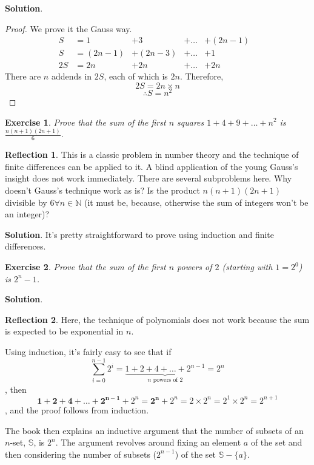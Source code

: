 \documentclass[11pt]{book}
\theoremstyle{definition}
\theoremstyle{plain}
\newtheorem{exercise}{Exercise}
\theoremstyle{definition}
\theoremstyle{problemstyle}
\theoremstyle{remark}
\theoremstyle{definition}
\newtheorem{reflection}{Reflection}
\begin{document}
\textbf{Solution}.
\begin{proof}
    We prove it the Gauss way.
\begin{align*}
    S  & =1      &+3      &+\dots&+(2n-1)&\\
    S  & =(2n-1) &+(2n-3) &+\dots&+     1&\\
    2S & =2n     &+2n      &+\dots&+2n
\end{align*}
There are $n$ addends in $2S$, each of which is $2n$. Therefore,
\[
    2S=2n\times n
\]
\[
    \therefore S=n^2
\]
\end{proof}
\begin{exercise}
    \label{ex:2.1.8}
    Prove that the sum of the first $n$ squares $1+4+9+\dots+n^2$ is $\frac{n(n+1)(2n+1)}{6}$.
\end{exercise}
\begin{reflection}
    This is a classic problem in number theory and the technique of finite differences can be applied to it. A blind application of the young Gauss's insight does not work immediately. There are several subproblems here. Why doesn't Gauss's technique work as is? Is the product $n(n+1)(2n+1)$ divisible by $6\forall n\in\mathbb{N}$ (it must be, because, otherwise the sum of integers won't be an integer)?

    
\end{reflection}
\textbf{Solution}.
It's pretty straightforward to prove using induction and finite differences.
\begin{exercise}
    \label{ex:2.1.9}
    Prove that the sum of the first $\mathit{n}$ powers of $\mathit{2}$ (starting with $\mathit{1=2^0}$) is $\mathit{2^n-1}$.
\end{exercise}
\textbf{Solution}.
\begin{reflection}
    Here, the technique of polynomials does not work because the sum is expected to be exponential in $n$.
\end{reflection}
Using induction, it's fairly easy to see that if
\[
    \sum_{i=0}^{n-1}2^i=\underbrace{1+2+4+\dots+2^{n-1}}_{n\text{ powers of $2$}}=2^n
\]
, then 
\[
    \boldsymbol{1+2+4+\dots+2^{n-1}}+2^n=\boldsymbol{2^n}+2^n=2\times2^n=2^1\times2^n=2^{n+1}
\]
, and the proof follows from induction.

The book then explains an inductive argument that the number of subsets of an $n$-set, $\mathbb{S}$, is $2^n$. The argument revolves around fixing an element $a$ of the set and then considering the number of subsets ($2^{n-1}$) of the set $\mathbb{S}-\{a\}$.
\end{document}
